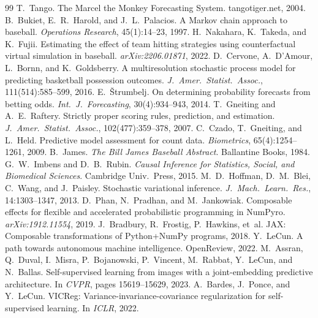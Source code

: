 \documentclass[10pt,twocolumn]{article}
\begin{document}
\begin{thebibliography}{99}\footnotesize
{} T.~Tango. The Marcel the Monkey Forecasting System. tangotiger.net, 2004.
 B.~Bukiet, E.~R.~Harold, and J.~L.~Palacios. A Markov chain approach to baseball.
\emph{Operations Research}, 45(1):14--23, 1997.
 H.~Nakahara, K.~Takeda, and K.~Fujii. Estimating the effect of team hitting strategies
using counterfactual virtual simulation in baseball. \emph{arXiv:2206.01871}, 2022.
 D.~Cervone, A.~D'Amour, L.~Bornn, and K.~Goldsberry. A multiresolution stochastic
process model for predicting basketball possession outcomes. \emph{J.\ Amer.\ Statist.\ Assoc.},
111(514):585--599, 2016.
 E.~\v{S}trumbelj. On determining probability forecasts from betting odds.
\emph{Int.\ J.\ Forecasting}, 30(4):934--943, 2014.
 T.~Gneiting and A.~E.~Raftery. Strictly proper scoring rules, prediction, and
estimation. \emph{J.\ Amer.\ Statist.\ Assoc.}, 102(477):359--378, 2007.
 C.~Czado, T.~Gneiting, and L.~Held. Predictive model assessment for count data.
\emph{Biometrics}, 65(4):1254--1261, 2009.
 B.~James. \emph{The Bill James Baseball Abstract}. Ballantine Books, 1984.
 G.~W.~Imbens and D.~B.~Rubin. \emph{Causal Inference for Statistics, Social, and
Biomedical Sciences}. Cambridge Univ.\ Press, 2015.
 M.~D.~Hoffman, D.~M.~Blei, C.~Wang, and J.~Paisley. Stochastic variational inference.
\emph{J.\ Mach.\ Learn.\ Res.}, 14:1303--1347, 2013.
 D.~Phan, N.~Pradhan, and M.~Jankowiak. Composable effects for flexible and accelerated
probabilistic programming in NumPyro. \emph{arXiv:1912.11554}, 2019.
 J.~Bradbury, R.~Frostig, P.~Hawkins, et~al. JAX: Composable transformations of
Python+NumPy programs, 2018.
 Y.~LeCun. A path towards autonomous machine intelligence. OpenReview, 2022.
 M.~Assran, Q.~Duval, I.~Misra, P.~Bojanowski, P.~Vincent, M.~Rabbat, Y.~LeCun, and
N.~Ballas. Self-supervised learning from images with a joint-embedding predictive architecture. In
\emph{CVPR}, pages 15619--15629, 2023.
 A.~Bardes, J.~Ponce, and Y.~LeCun. VICReg: Variance-invariance-covariance regularization
for self-supervised learning. In \emph{ICLR}, 2022.
\end{thebibliography}
\end{document}
